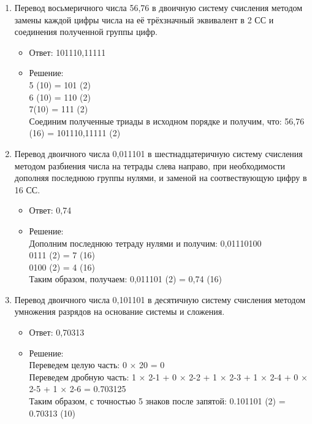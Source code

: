 \documentclass[14pt,final,oneside]{extreport}%
\begin{document}
\begin{enumerate}
        \item Перевод восьмеричного числа 56,76 в двоичную систему счисления методом замены каждой цифры числа на её трёхзначный эквивалент в 2 СС и соединения полученной группы цифр.
        \begin{itemize}
            \item Ответ: 101110,11111
            \item Решение: \\
                5 (10) = 101 (2) \\
                6 (10) = 110 (2) \\
                7(10) = 111 (2) \\
                Соединим полученные триады в исходном порядке и получим, что: 56,76 (16) = 101110,11111 (2)
        \end{itemize}

        \item Перевод двоичного числа 0,011101 в шестнадцатеричную систему счисления методом разбиения числа на тетрады слева направо, при необходимости дополняя последнюю группы нулями, и заменой на соотвествующую цифру в 16 СС.
        \begin{itemize}
            \item Ответ: 0,74
            \item Решение: \\
                Дополним последнюю тетраду нулями и получим: 0,01110100 \\
                0111 (2) = 7 (16) \\
                0100 (2) = 4 (16) \\
                Таким образом, получаем:  0,011101 (2) = 0,74 (16)
        \end{itemize}

        \item Перевод двоичного числа 0,101101 в десятичную систему счисления методом умножения разрядов на основание системы и сложения.
        \begin{itemize}
            \item Ответ: 0,70313
            \item Решение: \\
                Переведем целую часть: 0 × 20 = 0 \\
                Переведем дробную часть: 1 × 2-1 + 0 × 2-2 + 1 × 2-3 + 1 × 2-4 + 0 × 2-5 + 1 × 2-6 = 0.703125 \\
                Таким образом, с точностью 5 знаков после запятой: 0.101101 (2) = 0.70313 (10)
        \end{itemize}


\end{enumerate}
\end{document}
